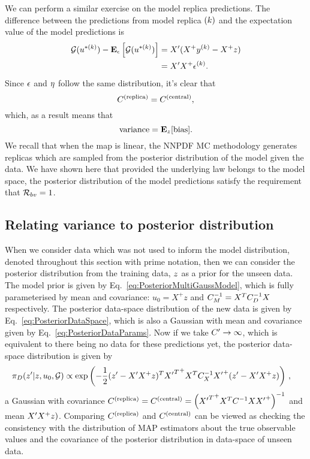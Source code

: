 We can perform a similar exercise on the model replica predictions. The difference
between the predictions from model replica $(k)$ and the expectation value
of the model predictions is
\begin{equation}
    \begin{split}
        \mathcal{G}(u^{* (k)}) - \mathbf{E}_{\epsilon}\left[ \mathcal{G}(u^{* (k)}) \right] &= X^\prime (X^+ y^{(k)} - X^+ z) \\
        &= X^\prime X^+ \epsilon^{(k)}.
    \end{split}
\end{equation}
Since $\epsilon$ and $\eta$ follow the same distribution, it's clear that
\begin{equation}
    C^{(\rm replica)} = C^{(\rm central)},
\end{equation}
which, as a result means that
\begin{equation}
    {\rm variance} = \mathbf{E}_{z}[{\rm bias}].
\end{equation}
We recall that when the map is linear, the NNPDF MC methodology generates replicas
which are sampled from the posterior distribution of the model given the data.
We have shown here that provided the underlying law belongs to the model
space, the posterior distribution of the model predictions satisfy the
requirement that $\mathcal{R}_{bv} = 1$.

\subsection{Relating variance to posterior distribution}

When we consider data which was not used to inform the model distribution,
denoted throughout this section with prime notation, then we can consider the posterior
distribution from the training data, $z$ as a prior for the unseen data.
The model prior is given by Eq.~\ref{eq:PosteriorMultiGaussModel}, which is fully
parameterised by mean and covariance: $u_0 = X^+ z$ and
$C_M^{-1} = X^TC^{-1}_{D}X$ respectively. The posterior data-space distribution
of the new data is given by Eq.~\ref{eq:PosteriorDataSpace}, which is also a
Gaussian with mean and covariance given by Eq.~\ref{eq:PosteriorDataParams}.
Now if we take ${C^{\prime}} \to \infty$, which is equivalent to there being
no data for these predictions yet, the posterior data-space distribution
is given by
\begin{equation}
    \begin{split}
        \pi_D(z^\prime|z,u_0,\mathcal{G}) &\propto \exp
        \left( - \frac{1}{2}
            (z^\prime - X^\prime X^+ z)^T
            {{X^\prime}^T}^+ X^T C^{-1}_{X} {X^\prime}^+
            (z^\prime - X^\prime X^+ z)
        \right) \, ,
    \end{split}
\end{equation}
a Gaussian with covariance
$C^{(\rm replica)} = C^{(\rm central)} = \left({{X^\prime}^T}^+ X^T C^{-1}_{} X {X^\prime}^+ \right)^{-1}$
and mean $X^\prime X^+ z)$. Comparing $C^{(\rm replica)}$ and $C^{(\rm central)}$ can be viewed
as checking the consistency with the distribution of MAP estimators about the
true observable values and the covariance of the posterior distribution
in data-space of unseen data.

